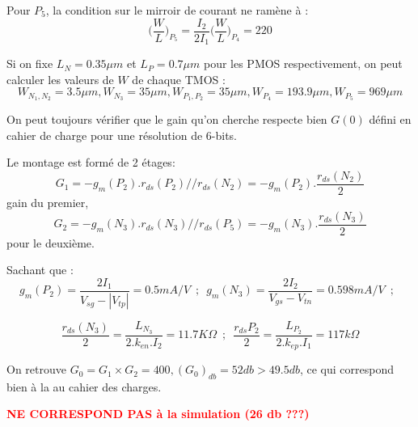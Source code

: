 \documentclass[11pt]{article}
\begin{document}
Pour $P_5$, la condition sur le mirroir de courant ne ram\`ene \`a :
\[
\bigg( \frac{W}{L} \bigg)_{P_{5}} = \frac{I_2}{2 I_1} \bigg( \frac{W}{L} \bigg)_{P_{4}} = 220
\]

Si on fixe $L_N = 0.35 \mu m$ et $L_P = 0.7 \mu m$ pour les PMOS respectivement, on peut calculer les
valeurs de $W$ de chaque TMOS :
\[
W_{N_1,N_2} = 3.5 \mu m, W_{N_3} = 35 \mu m, W_{P_1, P_2} = 35 \mu m, W_{P_4} = 193.9 \mu m, W_{P_5} = 969 \mu m
\]

On peut toujours v\'erifier que le gain qu'on cherche respecte bien $G(0)$ d\'efini en cahier de charge
pour une r\'esolution de 6-bits.

Le montage est form\'e de 2 \'etages:
\[
G_1 = - g_m (P_2).r_{ds}(P_2)//r_{ds}(N_2) = -g_m(P_2).\frac{r_{ds}(N_2)}{2}
\]
gain du premier,
\[
G_2 = - g_m (N_3).r_{ds}(N_3)//r_{ds}(P_5) = -g_m(N_3).\frac{r_{ds}(N_3)}{2}
\]
pour le deuxi\`eme.

Sachant que :
\[
g_m(P_2) = \frac{2I_1}{V_{sg} - | V_{tp} | } = 0.5  mA/V
\phantom{3}
;
\phantom{3}
g_m(N_3) = \frac{2 I_2}{V_{gs} - V_{tn}} = 0.598 mA/V
\phantom{3}
;
\phantom{3}
\]

\[
\frac{r_{ds}(N_3)}{2} = \frac{L_{N_{3}}}{2.k_{en}.I_{2}} = 11.7 K\Omega
\phantom{3}
;
\phantom{3}
\frac{r_{ds}{P_2}}{2} = \frac{L_{P_{2}}}{2.k_{ep}.I_{1}} = 117 k\Omega
\]

On retrouve $G_0 = G_1 \times G_2 = 400, (G_0)_{db} = 52 db > 49.5 db$, ce qui correspond bien \`a la
au cahier des charges.

\textbf{\textcolor{red}{NE CORRESPOND PAS \`a la simulation (26 db ???)}}

\clearpage

\end{document}
